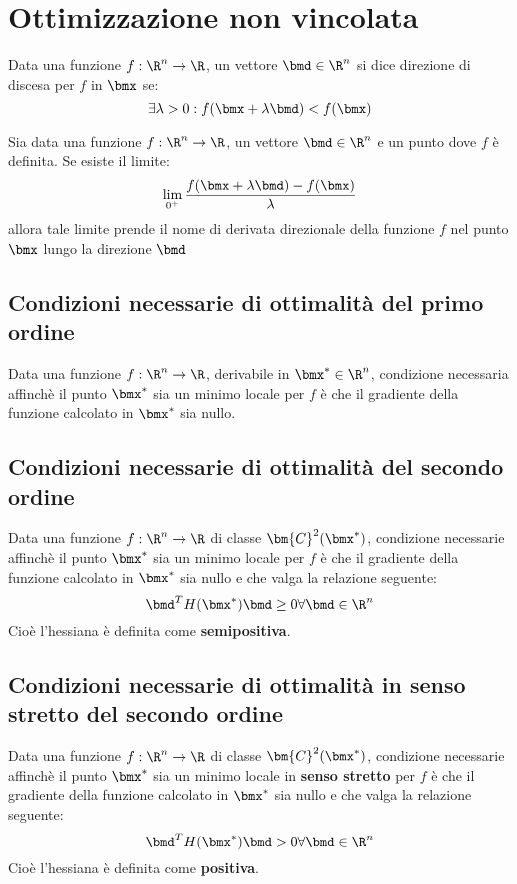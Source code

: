 \documentclass[\main/main.tex]{subfiles}
\begin{document}
\chapter{Ottimizzazione non vincolata}
\begin{definition}
    Data una funzione \(f:\R^n \rightarrow \R \), un vettore \(\bmd \in \R^n\) si dice direzione di discesa per \(f\) in \(\bmx \) se:
    \[
        \exists \lambda > 0: f(\bmx + \lambda\bmd) < f(\bmx)
    \]
\end{definition}
\begin{definition}
    Sia data una funzione \(f: \R^n \rightarrow \R \), un vettore \(\bmd \in \R^n\) e un punto dove \(f\) è definita. Se esiste il limite:
    \[
        \lim_{0^+} \frac{f(\bmx + \lambda\bmd) - f(\bmx)}{\lambda}
    \]
    allora tale limite prende il nome di derivata direzionale della funzione \(f\) nel punto \(\bmx \) lungo la direzione \(\bmd \)
\end{definition}

\section{Condizioni necessarie di ottimalità del primo ordine}
\begin{theorem}
    Data una funzione \(f: \R^n \rightarrow \R \), derivabile in \(\bmx^* \in \R^n\), condizione necessaria affinchè il punto \(\bmx^* \) sia un minimo locale per \(f\) è che il gradiente della funzione calcolato in \(\bmx^*\) sia nullo.
\end{theorem}
\section{Condizioni necessarie di ottimalità del secondo ordine}
\begin{theorem}
    Data una funzione \(f: \R^n \rightarrow \R \) di classe \(\bm{C}^2(\bmx^*)\), condizione necessarie affinchè il punto \(\bmx^* \) sia un minimo locale per \(f\) è che il gradiente della funzione calcolato in \(\bmx^*\) sia nullo e che valga la relazione seguente:
    \[
        \bmd^T H (\bmx^*)\bmd \geq 0 \forall \bmd \in \R^n
    \]
    Cioè l'hessiana è definita come \textbf{semipositiva}.
\end{theorem}
\section{Condizioni necessarie di ottimalità in senso stretto del secondo ordine}
\begin{theorem}
    Data una funzione \(f: \R^n \rightarrow \R \) di classe \(\bm{C}^2(\bmx^*)\), condizione necessarie affinchè il punto \(\bmx^* \) sia un minimo locale in \textbf{senso stretto} per \(f\) è che il gradiente della funzione calcolato in \(\bmx^*\) sia nullo e che valga la relazione seguente:
    \[
        \bmd^T H (\bmx^*)\bmd > 0 \forall \bmd \in \R^n
    \]
    Cioè l'hessiana è definita come \textbf{positiva}.
\end{theorem}
\end{document}
